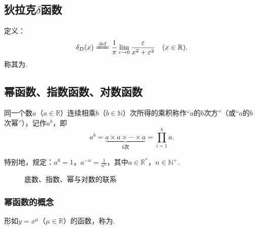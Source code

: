 \subsection{狄拉克\texorpdfstring{\(\delta\)}{\textdelta}函数}
\begin{definition}
定义：\[
\delta_D(x)
\defeq \frac{1}{\pi}
	\lim\limits_{\varepsilon\to0}
	\frac{\varepsilon}{x^2+\varepsilon^2}
\quad(x\in\mathbb{R}).
\]
称其为.
\end{definition}

\subsection{幂函数、指数函数、对数函数}
\begin{definition}
同一个数\(a\)（\(a\in\mathbb{R}\)）连续相乘\(b\)（\(b\in\mathbb{N}\)）次所得的乘积称作“\(a\)的\(b\)次方”（或“\(a\)的\(b\)次幂”），记作\(a^b\)，即\[
a^b = \underbrace{a \times a \times \dotsm \times a}_{b\text{次}} = \prod\limits_{i=1}^b a.
\]

特别地，规定：\(a^0 = 1\)，\(a^{-n} = \frac{1}{a^n}\)，其中\(a\in\mathbb{R}^*\)，\(n\in\mathbb{N}^+\).
\end{definition}

\begin{figure}[ht]
\centering
{}
\caption{底数、指数、幂与对数的联系}
\label{figure:函数.底数、指数、幂与对数的联系}
\end{figure}

\subsubsection{幂函数的概念}
\begin{definition}[幂函数]
形如\(y=x^{\mu}\)（\(\mu \in \mathbb{R}\)）的函数，称为.
\end{definition}

